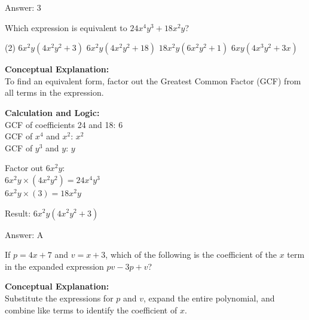 \documentclass[11pt,paper=a4,answers]{exam}
\begin{document}
\begin{questions}
\begin{solution}
\vspace{25pt}

Answer: \colorbox{yellow!100}{3}
\end{solution}

\vspace{40pt}

\question
Which expression is equivalent to $24x^4y^3 + 18x^2y$?
\begin{tasks}(2)
    \task $6x^2y(4x^2y^2 + 3)$
    \task $6x^2y(4x^2y^2 + 18)$
    \task $18x^2y(6x^2y^2 + 1)$
    \task $6xy(4x^3y^2 + 3x)$
\end{tasks}

\begin{solution}
\textbf{Conceptual Explanation:} \\
To find an equivalent form, factor out the Greatest Common Factor (GCF) from all terms in the expression.

\vspace{20pt}

\textbf{Calculation and Logic:} \\
GCF of coefficients 24 and 18: $6$ \\
GCF of $x^4$ and $x^2$: $x^2$ \\
GCF of $y^3$ and $y$: $y$

\vspace{10pt}

Factor out $6x^2y$: \\
$6x^2y \times (4x^2y^2) = 24x^4y^3$ \\
$6x^2y \times (3) = 18x^2y$

\vspace{10pt}

Result: $6x^2y(4x^2y^2 + 3)$

\vspace{25pt}

Answer: \colorbox{yellow!100}{A}
\end{solution}

\vspace{40pt}

\question
If $p = 4x + 7$ and $v = x + 3$, which of the following is the coefficient of the $x$ term in the expanded expression $pv - 3p + v$?

\begin{solution}
\textbf{Conceptual Explanation:} \\
Substitute the expressions for $p$ and $v$, expand the entire polynomial, and combine like terms to identify the coefficient of $x$.


\end{solution}
\end{questions}
\end{document}
